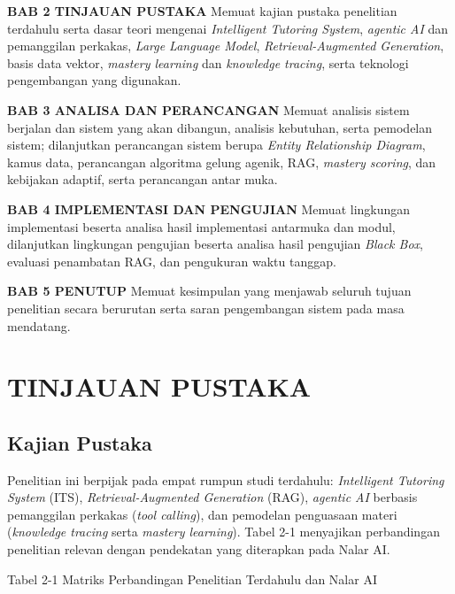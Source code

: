 \documentclass[12pt,a4paper]{article}
\begin{document}
\textbf{BAB 2 TINJAUAN PUSTAKA}  Memuat kajian pustaka penelitian terdahulu serta dasar teori mengenai \textit{Intelligent Tutoring System}, \textit{agentic AI} dan pemanggilan perkakas, \textit{Large Language Model}, \textit{Retrieval-Augmented Generation}, basis data vektor, \textit{mastery learning} dan \textit{knowledge tracing}, serta teknologi pengembangan yang digunakan.



\textbf{BAB 3 ANALISA DAN PERANCANGAN}  Memuat analisis sistem berjalan dan sistem yang akan dibangun, analisis kebutuhan, serta pemodelan sistem; dilanjutkan perancangan sistem berupa \textit{Entity Relationship Diagram}, kamus data, perancangan algoritma gelung agenik, RAG, \textit{mastery scoring}, dan kebijakan adaptif, serta perancangan antar muka.



\textbf{BAB 4 IMPLEMENTASI DAN PENGUJIAN}  Memuat lingkungan implementasi beserta analisa hasil implementasi antarmuka dan modul, dilanjutkan lingkungan pengujian beserta analisa hasil pengujian \textit{Black Box}, evaluasi penambatan RAG, dan pengukuran waktu tanggap.



\textbf{BAB 5 PENUTUP}  Memuat kesimpulan yang menjawab seluruh tujuan penelitian secara berurutan serta saran pengembangan sistem pada masa mendatang.



\section*{TINJAUAN PUSTAKA}

\subsection*{Kajian Pustaka}

Penelitian ini berpijak pada empat rumpun studi terdahulu: \textit{Intelligent Tutoring System} (ITS), \textit{Retrieval-Augmented Generation} (RAG), \textit{agentic AI} berbasis pemanggilan perkakas (\textit{tool calling}), dan pemodelan penguasaan materi (\textit{knowledge tracing} serta \textit{mastery learning}). Tabel 2-1 menyajikan perbandingan penelitian relevan dengan pendekatan yang diterapkan pada Nalar AI.



Tabel 2-1	Matriks Perbandingan Penelitian Terdahulu dan Nalar AI
\end{document}

